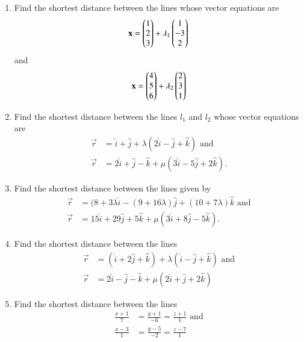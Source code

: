 \begin{enumerate}[label=\thesection.\arabic*,ref=\thesection.\theenumi]
    \item Find the shortest distance between the lines whose vector equations are
    \begin{align}
        \mathbf{x} = \begin{pmatrix}1\\2\\3\end{pmatrix} + \lambda_1\begin{pmatrix}1\\-3\\2\end{pmatrix}
        \label{eq:chapters/12/11/2/16/L1/svd}
    \end{align}
    and
    \begin{align}
        \mathbf{x} = \begin{pmatrix}4\\5\\6\end{pmatrix} + \lambda_2\begin{pmatrix}2\\3\\1\end{pmatrix}
        \label{eq:chapters/12/11/2/16/L2/svd}
    \end{align}
    \solution
		
\item Find the shortest distance between the lines $l_1$ and $l_2$ whose vector equations are 
\begin{align}
	\overrightarrow{r} &= \hat{i}+\hat{j}+\lambda(2\hat{i}-\hat{j}+\hat{k}) \text{ and}
	\\
	\overrightarrow{r} &= 2\hat{i}+\hat{j}-\hat{k}+\mu(3\hat{i}-5\hat{j}+2\hat{k}).
\end{align}
    \solution
		
\item Find the shortest distance between the lines given by 
\begin{align}
	\overrightarrow{r}&=(8+3\lambda\hat{i}-(9+16\lambda)\hat{j}+(10+7\lambda)\hat{k} \text{ and} 
	\\
	\overrightarrow{r}&=15\hat{i}+29\hat{j}+5\hat{k}+\mu(3\hat{i}+8\hat{j}-5\hat{k}).
\end{align}
\item Find the shortest distance between the lines
\begin{align}
	\overrightarrow{r}&=(\hat{i}+2\hat{j}+\hat{k})+\lambda(\hat{i}-\hat{j}+\hat{k}) \text{ and} 
	\\
	\overrightarrow{r}&=2\hat{i}-\hat{j}-\hat{k}+\mu(2\hat{i}+\hat{j}+2\hat{k})
\end{align}
\item Find the shortest distance between the lines
\begin{align}
	\frac{x+1}{7}&=\frac{y+1}{-6}=\frac{z+1}{1} \text{ and}
	\\
	\frac{x-3}{1}&=\frac{y-5}{-2}=\frac{z-7}{1}
\end{align}
    \solution
		
\end{enumerate}
